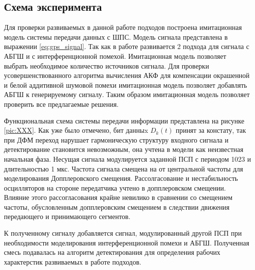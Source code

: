 \subsection{Схема эксперимента}
Для проверки развиваемых в данной работе подходов построена имитационная модель системы передачи данных с ШПС.
Модель сигнала представлена в выражении \ref{eq:gps_signal}. Так как в работе развивается 2 подхода для сигнала
с АБГШ и с интерференционной помехой. Имитационная модель позволяет выбрать необходимое количество источников сигнала.
Для проверки усовершенствованного алгоритма вычисления АКФ для компенсации окрашенной и белой аддитивной шумовой помехи
имитационная модель позволяет добавлять АБГШ к генерируемому сигналу. Таким образом имитационная модель позволяет проверить
все предлагаемые решения.

Функциональная схема системы передачи информации представлена на рисунке \ref{pic:XXX}. Как уже было отмечено, бит данныx ${D_k(t)}$
принят за констату, так при ДФМ переход нарушает гармоническую структуру входного сигнала и детектирование становится невозможным,
она учтена в модели как неизвестная начальная фаза. Несущая сигнала модулируется заданной ПСП с периодом 1023 и длительностью 1 мкс.
Частота сигнала смещена на от центральной частоты для моделирования Допплеровского смещения. Рассолгасование и нестабильность
осцилляторов на стороне передатчика учтено в допплеровском смещении. Влияние этого рассогласования крайне невилико в сравнении
со смещением частоты, обусловленным допплеровским смещением в следствии движения передающего и принимающего сегментов.

К полученному сигналу добавляется
сигнал, модулированный другой ПСП при необходимости моделирования интерференционной помехи и АБГШ. Полученная смесь подавалась
на алгоритм детектирования для определения рабочих характерстик развиваемых в работе подходов.
